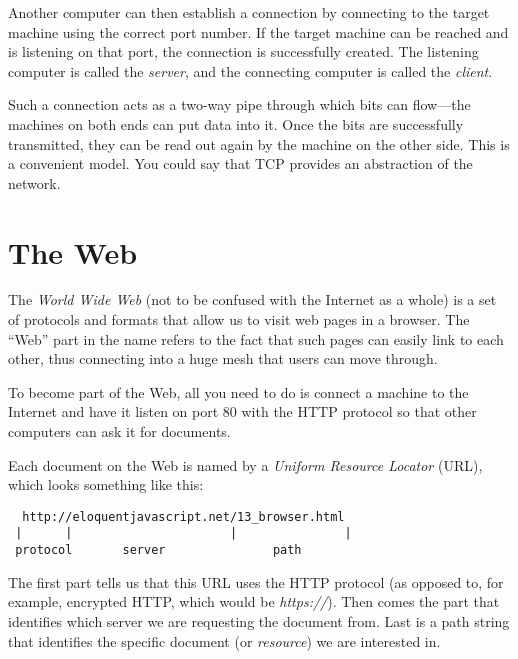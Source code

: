 Another computer can then establish a connection by connecting to the target machine using the correct port number. If the target machine can be reached and is listening on that port, the connection is successfully created. The listening computer is called the \emph{server}, and the connecting computer is called the \emph{client}.

Such a connection acts as a two-way pipe through which bits can flow—the machines on both ends can put data into it. Once the bits are successfully transmitted, they can be read out again by the machine on the other side. This is a convenient model. You could say that TCP provides an abstraction of the network.

\label{browser.web}\section{The Web}

The \emph{World Wide Web} (not to be confused with the Internet as a whole) is a set of protocols and formats that allow us to visit web pages in a browser. The ``Web'' part in the name refers to the fact that such pages can easily link to each other, thus connecting into a huge mesh that users can move through.

To become part of the Web, all you need to do is connect a machine to the Internet and have it listen on port 80 with the HTTP protocol so that other computers can ask it for documents.

Each document on the Web is named by a \emph{Uniform Resource Locator} (URL), which looks something like this:

\begin{lstlisting}
  http://eloquentjavascript.net/13_browser.html
 |      |                      |               |
 protocol       server               path
\end{lstlisting}
\noindent{}

The first part tells us that this URL uses the HTTP protocol (as opposed to, for example, encrypted HTTP, which would be \emph{https://}). Then comes the part that identifies which server we are requesting the document from. Last is a path string that identifies the specific document (or \emph{resource}) we are interested in.

